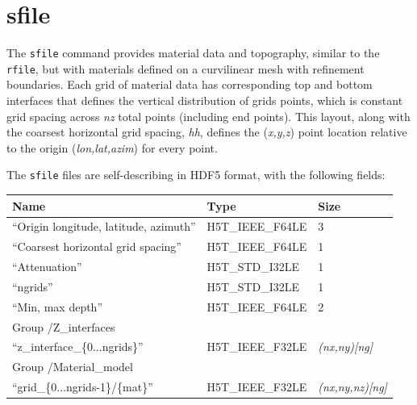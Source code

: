 \documentclass[11pt]{report}
\begin{document}
{\section{sfile}\label{sec:sfile-format}

The \verb+sfile+ command provides material data and topography,
similar  to the \verb+rfile+, but with materials defined on
a curvilinear mesh with refinement boundaries.
Each grid of material data has corresponding top and bottom interfaces
that defines the vertical distribution of grids points, which is constant
grid spacing across {\em nz} total points (including end points).
This layout, along with the coarsest horizontal grid spacing, {\em hh}, defines
the ({\em x,y,z}) point location relative to the origin ({\em lon,lat,azim})
for every point.

The \verb+sfile+ files are self-describing in HDF5 format, with
the following fields:
\begin{center}
	\begin{tabular}{lll}\hline
		Name                                    & Type             & Size                 \\ \hline
		``Origin longitude, latitude, azimuth'' & H5T\_IEEE\_F64LE & 3                    \\ \hline
		``Coarsest horizontal grid spacing''    & H5T\_IEEE\_F64LE & 1                    \\ \hline
		``Attenuation''                         & H5T\_STD\_I32LE  & 1                    \\ \hline
		``ngrids''                              & H5T\_STD\_I32LE  & 1                    \\ \hline
		``Min, max depth''                      & H5T\_IEEE\_F64LE & 2                    \\ \hline
		Group /Z\_interfaces                                                              \\ \hline
		``z\_interface\_\{0...ngrids\}''        & H5T\_IEEE\_F32LE & {\em (nx,ny)[ng]}    \\ \hline
		Group /Material\_model                                                            \\ \hline
		``grid\_\{0...ngrids-1\}/\{mat\}''      & H5T\_IEEE\_F32LE & {\em (nx,ny,nz)[ng]} \\ \hline
	\end{tabular}
\end{center}

}
\end{document}
